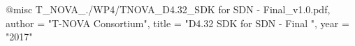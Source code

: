 @misc{ T_NOVA_./WP4/TNOVA_D4.32_SDK for SDN - Final_v1.0.pdf,
       author = "{T-NOVA Consortium}",
       title = "D4.32 SDK for SDN - Final ",
       year = "2017" }
